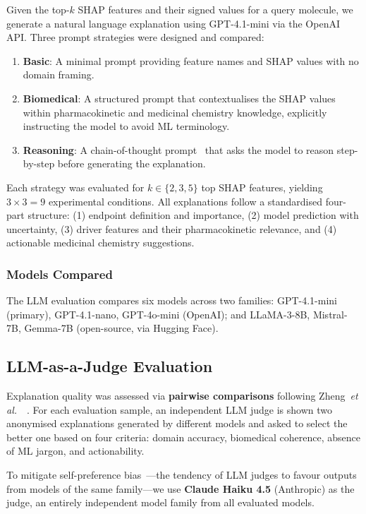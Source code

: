 \documentclass[a4paper, 11pt]{article}
\newcommand{\etal}{\textit{et al.}\ }
\begin{document}
Given the top-$k$ SHAP features and their signed values for a query
molecule, we generate a natural language explanation using
GPT-4.1-mini via the OpenAI API. Three prompt strategies were
designed and compared:

\begin{enumerate}
  \item \textbf{Basic}: A minimal prompt providing feature names and SHAP
        values with no domain framing.
  \item \textbf{Biomedical}: A structured prompt that contextualises the
        SHAP values within pharmacokinetic and medicinal chemistry
        knowledge, explicitly instructing the model to avoid ML
        terminology.
  \item \textbf{Reasoning}: A chain-of-thought prompt~\cite{wei2022chain}
        that asks the model to reason step-by-step before generating the
        explanation.
\end{enumerate}

Each strategy was evaluated for $k \in \{2, 3, 5\}$ top SHAP features,
yielding $3 \times 3 = 9$ experimental conditions. All explanations follow
a standardised four-part structure: (1) endpoint definition and importance,
(2) model prediction with uncertainty, (3) driver features and their
pharmacokinetic relevance, and (4) actionable medicinal chemistry
suggestions.

\subsubsection{Models Compared}

The LLM evaluation compares six models across two families:
GPT-4.1-mini (primary), GPT-4.1-nano, GPT-4o-mini (OpenAI); and
LLaMA-3-8B, Mistral-7B, Gemma-7B (open-source, via Hugging Face).

\subsection{LLM-as-a-Judge Evaluation}

Explanation quality was assessed via \textbf{pairwise comparisons}
following Zheng~\etal~\cite{zheng2023judging}. For each evaluation sample,
an independent LLM judge is shown two anonymised explanations generated by
different models and asked to select the better one based on four criteria:
domain accuracy, biomedical coherence, absence of ML jargon, and
actionability.

To mitigate self-preference bias~\cite{zheng2023judging}---the tendency of
LLM judges to favour outputs from models of the same family---we use
\textbf{Claude Haiku 4.5} (Anthropic) as the judge, an entirely independent
model family from all evaluated models.
\end{document}
